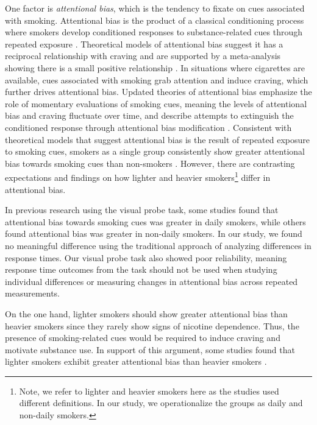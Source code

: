 \documentclass[empirical, authordate, issue]{jote-new-article}
\begin{document}
One factor is \emph{attentional bias}, which is the tendency to fixate on cues associated with smoking. Attentional bias is the product of a classical conditioning process where smokers develop conditioned responses to substance-related cues through repeated exposure \parencite{Field2008}. Theoretical models of attentional bias suggest it has a reciprocal relationship with craving and are supported by a meta-analysis showing there is a small positive relationship \parencite{Field2009}. In situations where cigarettes are available, cues associated with smoking grab attention and induce craving, which further drives attentional bias. Updated theories of attentional bias emphasize the role of momentary evaluations of smoking cues, meaning the levels of attentional bias and craving fluctuate over time, and describe attempts to extinguish the conditioned response through attentional bias modification \parencite{Field2016}. Consistent with theoretical models that suggest attentional bias is the result of repeated exposure to smoking cues, smokers as a single group consistently show greater attentional bias towards smoking cues than non-smokers \parencite{Baschnagel2013, Ehrman2002, Kang2012, Mogg2003}. However, there are contrasting expectations and findings on how lighter and heavier smokers\footnote{Note, we refer to lighter and heavier smokers here as the studies used different definitions. In our study, we operationalize the groups as daily and non-daily smokers.} differ in attentional bias.

\begin{takeHomeMessage}
  In previous research using the visual probe task, some studies found that attentional bias towards smoking cues was greater in daily smokers, while others found attentional bias was greater in non-daily smokers. In our study, we found no meaningful difference using the traditional approach of analyzing differences in response times. Our visual probe task also showed poor reliability, meaning response time outcomes from the task should not be used when studying individual differences or measuring changes in attentional bias across repeated measurements.
\end{takeHomeMessage}
On the one hand, lighter smokers should show greater attentional bias than heavier smokers since they rarely show signs of nicotine dependence. Thus, the presence of smoking-related cues would be required to induce craving and motivate substance use. In support of this argument, some studies found that lighter smokers exhibit greater attentional bias than heavier smokers \parencite{Bradley2003, Hogarth2003, Mogg2005}.
\end{document}
